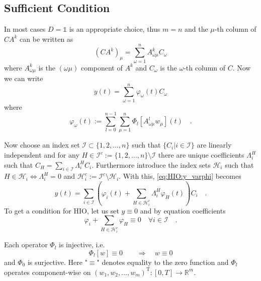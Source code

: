 \subsection{Sufficient Condition}
In most cases $D=\mathbb{1}$ is an appropriate choice, thus $m=n$ and the $\mu$-th column
of $CA^k$ can be written as
\begin{equation}
\left(CA^k \right)_\mu = \sum\limits_{\omega = 1}^n A^k_{\omega\mu} C_\omega
\end{equation}
where $A^k_{\omega\mu}$ is the $(\omega\mu)$ component of $A^k$ and $C_\omega$ is the 
$\omega$-th column of $C$.
Now we can write 
\begin{equation}
y(t) = \sum\limits_{\omega=1}^n \varphi_\omega (t) C_\omega  \label{eq:HIO:y_varphi}
\end{equation}
where 
\begin{equation}
\varphi_\omega(t) :=\sum\limits_{l=0}^{n-1}  
\sum\limits_{\mu=1}^{n} 
 \Phi_l\left[A^l_{\omega\mu} w_\mu \right](t) \quad .
\end{equation}

Now choose an index set $\mathcal{I}\subset \{1,2,\ldots,n\}$ such that $\{C_i|i\in
	\mathcal{I}\}$ are linearly 
	independent and for any $H\in \mathcal{I}^c:=\{1,2,\ldots,n\}\setminus \mathcal{I}$
	 there are unique coefficients $
	\Lambda_i^H$ such that $C_H=\sum_{i\in\mathcal{I}} \Lambda^H_i C_i$. 
	Furthermore introduce the index sets $\mathcal{H}_i$ such that $H\in \mathcal{H}_i 
	\Leftrightarrow \Lambda_i^H = 0$ and $\mathcal{H}_i^c:=\mathcal{I}^c\setminus 
	\mathcal{H}_i$. With this, \eqref{eq:HIO:y_varphi} becomes 
\begin{equation}
y(t) = \sum\limits_{i\in\mathcal{I}} \left(\varphi_i(t) + \sum\limits_{H\in 
	\mathcal{H}^c_i}\Lambda^H_i \varphi_H(t) \right) C_i  \quad .
\end{equation}
To get a condition for HIO, let us set $y\equiv 0$ and by equation coefficients 
\begin{equation}
\varphi_i + \sum\limits_{H\in\mathcal{H}_i^c} \varphi_H 
\equiv 0 \quad \forall i\in\mathcal{I} \quad . \label{eq:HIO:varphi=0}
\end{equation}


\begin{proposition} \label{prop:HIO:Phi_injective}
Each operator $\Phi_l$ is injective, i.e. 
\begin{equation}
\Phi_l[w] \equiv 0\quad \quad \Rightarrow  \quad w \equiv 0  
\end{equation}
and $\Phi_0$ is surjective.
Here "$\equiv$" denotes equality to the zero function and $\Phi_l$ operates 
component-wise on $(w_1,w_2,\ldots,w_m)^\text{T}:[0,T]\rightarrow \mathbb{R}^m$.
\end{proposition}

